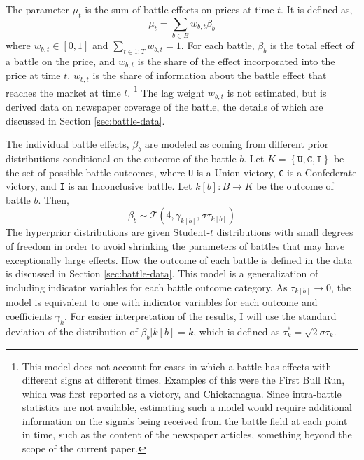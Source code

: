 \documentclass[11pt, oneside, article]{memoir}
\newcommand{\dist}[1]{\mathcal{#1}}
\newcommand{\paren}[1]{\mathopen{}\left(#1\right)\mathclose{}}
\newcommand{\disti}[2]{\ensuremath{\dist{#1}\paren{#2}}}
\newcommand{\dt}[1]{\disti{T}{#1}}
\begin{document}
The parameter $\mu_{t}$ is the sum of battle effects on prices at time $t$. 
It is defined as,
\begin{equation}
  \label{eq:5}
  \mu_{t} = \sum_{b \in B} w_{b, t} \beta_{b}
\end{equation}
where $w_{b, t} \in [0, 1]$ and  $\sum_{t \in 1:T} w_{b,t} = 1$.
For each battle, $\beta_{b}$ is the total effect of a battle on the price, and $w_{b,t}$ is the share of the effect incorporated into the price at time $t$.
$w_{b,t}$ is the share of information about the battle effect that reaches the market at time $t$.%
\footnote{
  This model does not account for cases in which a battle has effects with different signs at different times.
  Examples of this were the First Bull Run, which was first reported as a victory, and Chickamagua.
  Since intra-battle statistics are not available, estimating such a model would require additional information on the signals being received from the battle field at each point in time, such as the content of the newspaper articles, something beyond the scope of the current paper.
}
The lag weight $w_{b,t}$ is not estimated, but is derived data on newspaper coverage of the battle, the details of which are discussed in Section \ref{sec:battle-data}.

The individual battle effects, $\beta_{b}$ are modeled as coming from different prior distributions conditional on the outcome of the battle $b$.
Let $K =\left\{ \mathtt{U}, \mathtt{C}, \mathtt{I} \right\}$ be the set of possible battle outcomes, where \texttt{U} is a Union victory, \texttt{C} is a Confederate victory, and \texttt{I} is an Inconclusive battle.
Let $k[b] : B \to K$ be the outcome of battle $b$.%
Then,
\begin{equation}
  \label{eq:2}
  \beta_{b} \sim \dt{4, \gamma_{k[b]}, \sigma \tau_{k[b]}}
\end{equation}
The hyperprior distributions are given Student-$t$ distributions with small degrees of freedom in order to avoid shrinking the parameters of battles that may have exceptionally large effects.
How the outcome of each battle is defined in the data is discussed in Section \ref{sec:battle-data}.
This model is a generalization of including indicator variables for each battle outcome category.
As $\tau_{k[b]} \to 0$, the model is equivalent to one with indicator variables for each outcome and coefficients $\gamma_{k}$.
For easier interpretation of the results, I will use the standard deviation of the distribution of $\beta_{b} | k[b] = k$, which is defined as $\tau^{*}_{k} = \sqrt{2} \sigma \tau_{k}$.
\end{document}

